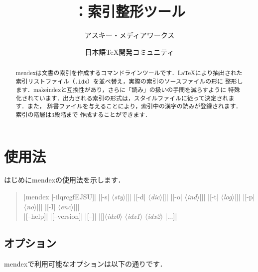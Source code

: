 \documentclass[a4paper,dvipdfmx]{jsarticle}
\title{\SoftName{mendex}：索引整形ツール \MendexVersion}
\author{アスキー・メディアワークス \and 日本語\TeX 開発コミュニティ}
\newenvironment{syntax}{\begin{quote}\small}{\end{quote}}
\newcommand{\SoftName}[1]{\textsf{#1}}
\newcommand{\FileExtension}[1]{\texttt{.#1}}
\newcommand{\Meta}[1]{$\langle$\mbox{}\textit{#1}\mbox{}$\rangle$}
\begin{document}
\maketitle

\begin{abstract}
\SoftName{mendex}は文書の索引を作成するコマンドラインツールです．\LaTeX により抽出された
索引リストファイル（\FileExtension{idx}）を並べ替え，実際の索引のソースファイルの形に
整形します．\SoftName{makeindex}と互換性があり，さらに「読み」の扱いの手間を減らすように
特殊化されています．出力される索引の形式は，スタイルファイルに従って決定されます．また，
辞書ファイルを与えることにより，索引中の漢字の読みが登録されます．索引の階層は3段階まで
作成することができます．
\end{abstract}

\tableofcontents
\clearpage

\section{使用法}

はじめに\SoftName{mendex}の使用法を示します．
%
\begin{syntax}
|mendex [-ilqrcgfEJSU]|
|[-s| \Meta{sty}|]|
|[-d| \Meta{dic}|]|
|[-o| \Meta{ind}|]|
|[-t| \Meta{log}|]|
|[-p| \Meta{no}|]|
|[-I| \Meta{enc}|]| \\
%
|[--help]|
|[--version]|
|[--]|
|[|\Meta{idx0} \Meta{idx1} \Meta{idx2} |...]|
\end{syntax}

\subsection{オプション}

\SoftName{mendex}で利用可能なオプションは以下の通りです．
\end{document}
